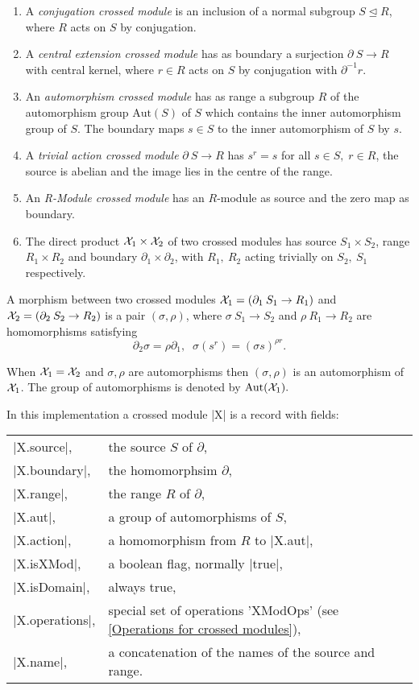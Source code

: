\begin{enumerate}
\item A {\em conjugation crossed module}
      is an  inclusion of a  normal subgroup  $S  \unlhd R$, where $R$
      acts on $S$ by conjugation.
\item A {\em central extension crossed module} has as boundary a surjection
      $\partial \: S \to R$ with central  kernel, where $r \in R$ acts
      on $S$ by conjugation with $\partial^{-1}r$.
\item An {\em automorphism crossed module} has as range a subgroup $R$
      of the automorphism  group $\mbox{Aut}(S)$ of $S$ which contains
      the inner  automorphism group of $S$.  The  boundary maps $s \in
      S$ to the inner automorphism of $S$ by $s$.
\item A {\em trivial action crossed module}  $\partial \: S \to R$
      has $s^r =  s$ for all  $s \in S,  \; r \in   R$, the source  is
      abelian and the image lies in the centre of the range.
\item An {\em R-Module crossed module} has an $R$-module as source
      and the zero map as boundary.
\item The direct product  ${\cal X}_{1} \times {\cal X}_{2}$
      of two crossed  modules has source $S_1  \times S_2$, range $R_1
      \times R_2$ and   boundary $\partial_1 \times \partial_2$,  with
      $R_1,\ R_2$ acting trivially on $S_2,\ S_1$ respectively.
\end{enumerate}

A morphism between two crossed  modules ${\cal X}_{1} = (\partial_1 \:
S_1 \to R_1)$ and  ${\cal X}_{2} = (\partial_2  \: S_2 \to R_2)$ is  a
pair $(\sigma,  \rho)$, where $  \sigma \: S_1 \to S_2$  and $ \rho \:
R_1 \to R_2$ are homomorphisms satisfying 
$$\partial_2 \sigma = \rho \partial_1, \; \;
\sigma(s^r) = (\sigma s)^{\rho r}.
$$  

When ${\cal X}_{1}    = {\cal X}_{2}$ and   $  \sigma, \rho $  are
automorphisms then $(\sigma,  \rho)$   is an automorphism   of  ${\cal
X}_1$.  The group of  automorphisms is denoted  by $\mathrm{Aut}({\cal
X}_1 ).$


In this implementation a crossed module  |X|  is a record with fields:

\begin{tabular}{ll}
|X.source|,     & the source $S$ of $\partial$,       \\
|X.boundary|,   & the homomorphsim $\partial$,        \\
|X.range|,      & the range $R$ of $\partial$,        \\
|X.aut|,        & a group of automorphisms of $S$,    \\
|X.action|,     & a homomorphism from $R$ to |X.aut|, \\
|X.isXMod|,     & a boolean flag, normally |true|,    \\
|X.isDomain|,   & always true,                        \\
|X.operations|, & special set of operations 'XModOps'
                  (see \ref{Operations for crossed modules}),  \\
|X.name|,       & a concatenation of the names of the source and range.
\end{tabular}

